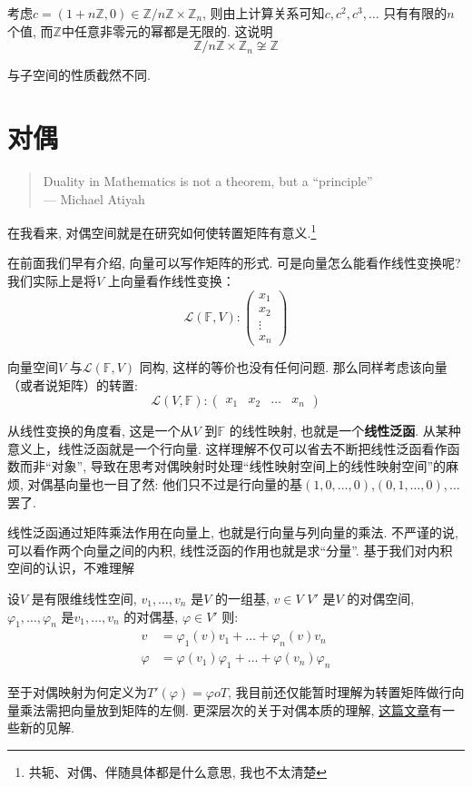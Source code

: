 考虑\(c=(1+n\mathbb{Z},0) \in \mathbb{Z}/n\mathbb{Z} \times
\mathbb{Z}_{n}\), 则由上计算关系可知\(c, c^{2}, c^{3}, \dots \) 只有有限的\(n\) 个值,
而\(\mathbb{Z}\)中任意非零元的幂都是无限的. 这说明
\[
    \mathbb{Z}/n\mathbb{Z} \times \mathbb{Z}_{n} \not\cong
    \mathbb{Z}
\]

与子空间的性质截然不同.

\section{对偶}

\begin{quote}
    Duality in Mathematics is not a theorem, but a ``principle''\\
    \hfill --- Michael Atiyah
\end{quote}

在我看来, 对偶空间就是在研究如何使转置矩阵有意义.\footnote{共轭、对偶、伴随具体都是什么意思,
我也不太清楚}

在前面我们早有介绍, 向量可以写作矩阵的形式. 可是向量怎么能看作线性变换呢? 我们实际上是将\(V\)
上向量看作线性变换：\[
    \mathscr{L}(\mathbb{F},V):
    \begin{pmatrix}
        x_1 \\
        x_2 \\
        \vdots \\
        x_n
    \end{pmatrix}
\]

向量空间\(V\) 与\(\mathscr{L}(\mathbb{F},V)\) 同构, 这样的等价也没有任何问题.
那么同样考虑该向量（或者说矩阵）的转置:
\[
    \mathscr{L}(V,\mathbb{F}):
    \begin{pmatrix}
        x_1 & x_2 & \dots & x_n
    \end{pmatrix}
\]

从线性变换的角度看, 这是一个从\(V\) 到\(\mathbb{F}\) 的线性映射, 也就是一个\textbf{线性泛函}.
从某种意义上，线性泛函就是一个行向量. 这样理解不仅可以省去不断把线性泛函看作函数而非``对象'',
导致在思考对偶映射时处理``线性映射空间上的线性映射空间''的麻烦, 对偶基向量也一目了然:
他们只不过是行向量的基\((1,0,\dots ,0)\),\((0,1,\dots ,0),\dots \) 罢了.

线性泛函通过矩阵乘法作用在向量上, 也就是行向量与列向量的乘法. 不严谨的说, 可以看作两个向量之间的内积,
线性泛函的作用也就是求``分量''. 基于我们对内积空间的认识，不难理解
\begin{theorem}
    设\(V\) 是有限维线性空间, \(v_{1}, \dots ,v_{n}\) 是\(V\) 的一组基, \(v \in V\)
    \(V'\) 是\(V\) 的对偶空间, \(\varphi_{1}, \dots ,\varphi_{n}\)
    是\(v_{1}, \dots ,v_{n}\) 的对偶基, \(\varphi \in V'\)
    则:
    \begin{align*}
        v &= \varphi_{1}(v)v_{1} + \dots + \varphi_{n}(v)v_{n} \\
        \varphi &= \varphi(v_{1})\varphi_{1} + \dots +
        \varphi(v_{n})\varphi_{n}
    \end{align*}
\end{theorem}

至于对偶映射为何定义为\(T'(\varphi)=\varphi o T\),
我目前还仅能暂时理解为转置矩阵做行向量乘法需把向量放到矩阵的左侧. 更深层次的关于对偶本质的理解,
\href{https://www.zhihu.com/question/38464481/answer/2110009942}{这篇文章}有一些新的见解.